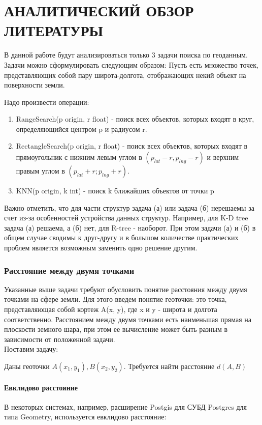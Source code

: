 \chapter{АНАЛИТИЧЕСКИЙ ОБЗОР ЛИТЕРАТУРЫ}
\label{cha:analysis}

В данной работе будут анализироваться только 3 задачи поиска по геоданным. Задачи можно сформулировать следующим образом:
Пусть есть множество точек, представляющих собой пару широта-долгота, отображающих некий объект на поверхности земли.

Надо произвести операции:
\begin{enumerate}
    \item  RangeSearch(p origin, r float) - поиск всех объектов, которых входят в круг, определяющийся центром p и радиусом r.
    \item  RectangleSearch(p origin, r float) - поиск всех объектов, которых входят в прямоугольник с нижним левым углом в $(p_{lat} - r, p_{lng} - r)$ и верхним правым углом в  $(p_{lat} + r; p_{lng} + r)$.
    \item  KNN(p origin, k int) - поиск k ближайших объектов от точки p
\end{enumerate}
Важно отметить, что для части структур задача (а) или задача (б) нерешаемы за счет из-за особенностей устройства данных структур. Например, для K-D tree задача (а) решаема, а (б) нет, для R-tree - наоборот. При этом задачи (а) и (б) в общем случае сводимы к друг-другу и в большом количестве практических проблем является возможным заменить одно решение другим.

\subsection{Расстояние между двумя точками}
Указанные выше задачи требуют обусловить понятие расстояния между двумя точками на сфере земли. Для этого введем понятие геоточки: это точка, представляющая собой кортеж A(x, y), где x и y - широта и долгота соответственно.
Расстоянием между двумя точками есть наименьшая прямая на плоскости земного шара, при этом ее вычисление может быть разным в зависимости от положенной задачи. \\
Поставим задачу:

Даны геоточки $A(x_1, y_1), B(x_2, y_2)$. Требуется найти расстояние $d(A, B)$

\subsubsection{Евклидово расстояние}
В некоторых системах, например, расширение Postgis для СУБД Postgres для типа Geometry, используется евклидово расстояние:

